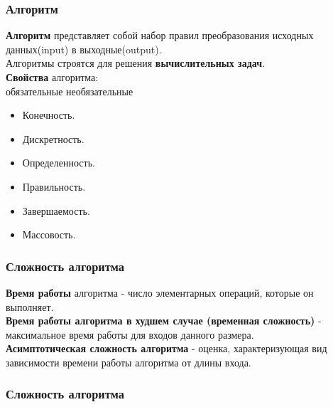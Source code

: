 \documentclass[russian, 12pt]{beamer}
\begin{document}
\begin{frame}
\frametitle{Алгоритм}
\textbf{Алгоритм} представляет собой набор правил преобразования исходных данных(input) 
в выходные(output).\\[0.2cm]
\pause
Алгоритмы строятся для решения \textbf{вычислительных задач}.\\[0.2cm]
\pause
\textbf{Свойства} алгоритма:\\[0.2cm]
обязательные \hspace{3cm} необязательные
\begin{multicols}{2}
\begin{itemize}
  \item<4-> [1] Конечность.\\[0.3cm]

  \item<5-> [2] Дискретность.\\[0.3cm]

  \item<6-> [3] Определенность.\\[0.3cm]
  
  \item<7-> [4] Правильность. \\[0.3cm]
  
  \item<8-> [5] Завершаемость. \\[0.3cm]
  
  \item<9-> [6] Массовость. \\

\end{itemize}
\end{multicols}
\end{frame}
\begin{frame}
\frametitle{Сложность алгоритма}
\textbf{Время работы} алгоритма - 
число элементарных операций, которые он выполняет.\\[0.3cm]
\pause
\textbf{Время работы алгоритма в худшем случае (временная сложность)} - 
максимальное время работы для входов данного размера. \\[0.3cm]
\pause
\textbf{Асимптотическая сложность алгоритма} - 
оценка, характеризующая вид зависимости времени работы алгоритма от длины входа.

\end{frame}
\lstset{style=mystyle}
\begin{frame}
\frametitle{Сложность алгоритма}

\end{frame}
\end{document}
